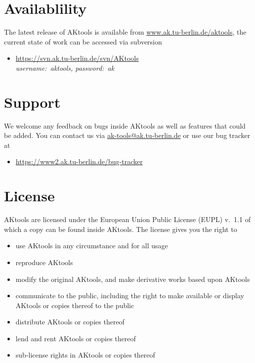 \documentclass[11pt]{scrartcl}
\begin{document}
\section*{{\color{tu_red}Availablility}}
\noindent The latest release of AKtools is available from \url{www.ak.tu-berlin.de/aktools}, the current state of work can be accessed via subversion
\begin{itemize}
	\item[] \url{https://svn.ak.tu-berlin.de/svn/AKtools}\\
	\emph{username:~aktools, password:~ak}
\end{itemize}
\vfill

\section*{{\color{tu_red}Support}}
\noindent We welcome any feedback on bugs inside AKtools as well as features that could be added. You can contact us via \href{mailto:ak-tools@ak.tu-berlin.de}{ak-tools@ak.tu-berlin.de} or use our bug tracker at
\begin{itemize}
	\item[] \url{https://www2.ak.tu-berlin.de/bug-tracker}\\
\end{itemize}
\vfill

\section*{{\color{tu_red}License}}
AKtools are licensed under the European Union Public License (EUPL) v.~1.1 of which a copy can be found inside AKtools.
The license gives you the right to
\begin{itemize}
	\item use AKtools in any circumstance and for all usage
	\item reproduce AKtools
	\item modify the original AKtools, and make derivative works based upon AKtools
	\item communicate to the public, including the right to make available or display AKtools or copies thereof to the public
	\item distribute AKtools or copies thereof
	\item lend and rent AKtools or copies thereof
	\item sub-license rights in AKtools or copies thereof
\end{itemize}
\end{document}
